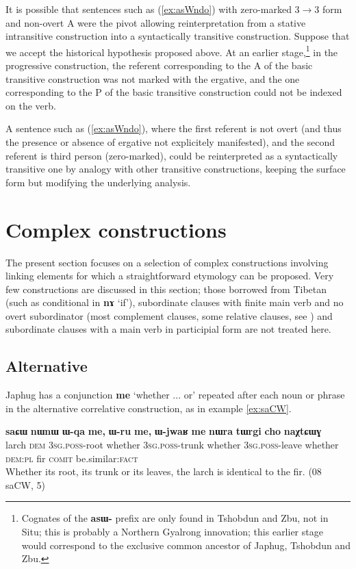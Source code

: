 \documentclass[oldfontcommands,oneside,a4paper,11pt]{article}
\newcommand{\ipa}[1]{\mbox{\phon\textbf{#1}}} %
\begin{document}
It is possible that sentences such as (\ref{ex:asWndo}) with zero-marked 3$\rightarrow$3 form and non-overt A were the pivot allowing reinterpretation from a stative intransitive construction into a syntactically transitive construction. Suppose that we accept the historical hypothesis proposed above. At an earlier stage,\footnote{Cognates of the \ipa{asɯ-} prefix are only found in Tshobdun and Zbu, not in Situ; this is probably a Northern Gyalrong innovation; this earlier stage would correspond to the exclusive common ancestor of Japhug, Tshobdun and Zbu.} in the progressive construction, the referent corresponding to the A of the basic transitive construction was not marked with the ergative, and the one corresponding to the P of the basic transitive construction could not be indexed on the verb. 

A sentence such as (\ref{ex:asWndo}), where the first referent is not overt (and thus the presence or absence of ergative not explicitely manifested), and the second referent is third person (zero-marked),  could be reinterpreted as a syntactically transitive one by analogy with other transitive constructions, keeping the surface form but modifying the underlying analysis.

\section{Complex constructions} 
The present section focuses on a selection of complex constructions involving linking elements for which a straightforward etymology can be proposed.  Very few constructions are discussed in this section; those borrowed from Tibetan (such as conditional in \ipa{nɤ} `if'), subordinate clauses with finite main verb and no overt subordinator   (most complement clauses, some relative clauses, see \citealt{jacques16relatives}) and subordinate clauses with a main verb in participial form are not treated here.

\subsection{Alternative}
 Japhug has a conjunction \ipa{me}  `whether ... or' repeated after each noun or phrase in the alternative correlative construction, as in example \ref{ex:saCW}.
 
\begin{exe}
\ex \label{ex:saCW}
\gll  \ipa{saɕɯ} 	\ipa{nɯnɯ} 	\ipa{ɯ-qa} 	\ipa{me,} 	\ipa{ɯ-ru} 	\ipa{me,} 	\ipa{ɯ-jwaʁ} 	\ipa{me} 	\ipa{nɯra} 	\ipa{tɯrgi} 	\ipa{cho} 	\ipa{naχtɕɯɣ} \\
 larch \textsc{dem} \textsc{3sg.poss}-root whether \textsc{3sg.poss}-trunk whether \textsc{3sg.poss}-leave whether \textsc{dem:pl} fir  \textsc{comit} be.similar:\textsc{fact} \\
\glt Whether its root, its trunk or its leaves, the larch is identical to the fir. (08 saCW, 5)
\end{exe} 
\end{document}
